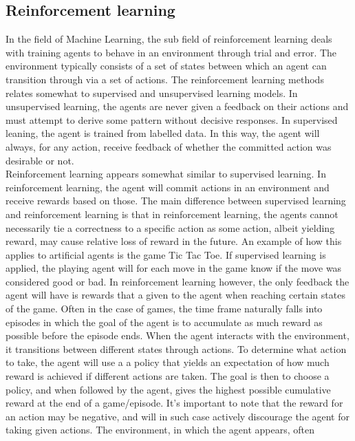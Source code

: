 \subsection{Reinforcement learning \label{RL}}

In the field of Machine Learning, the sub field of reinforcement learning
deals with training agents to behave in an environment through
trial and error. The environment typically consists of a set of states
between which an agent can transition through via a set of actions.
The reinforcement learning methods relates somewhat 
to supervised and unsupervised learning models. In unsupervised 
learning, the agents are never given a feedback on their actions
and must attempt to derive some pattern without decisive responses.
In supervised leaning, the agent is trained from labelled data.
In this way, the agent will always, for any action, receive 
feedback of whether the committed action was desirable or not.\\
Reinforcement learning appears somewhat similar to supervised learning.
In reinforcement learning, the agent will commit actions in an environment
and receive rewards based on those. The main difference between supervised
learning and reinforcement learning is that in reinforcement learning,
the agents cannot necessarily tie a correctness 
to a specific action as some action, albeit yielding reward,
may cause relative loss of reward in the future. An example of how this applies 
to artificial agents is the game Tic Tac Toe. If supervised learning
is applied, the playing agent will for each move in the game know
if the move was considered good or bad. In reinforcement learning however,
the only feedback the agent will have is rewards that a given 
to the agent when reaching certain states of the game. 
Often in the case of games, the 
time frame naturally falls into episodes in which the 
goal of the agent is to accumulate as much reward as possible 
before the episode ends. When the agent interacts 
with the environment, it transitions between different states through 
actions. To determine what action to take, the agent will use
a a policy that yields an expectation of how much reward is achieved
if different actions are taken. 
The goal is then to choose a policy, and when followed by the agent,
gives the highest possible cumulative reward at the end of a game/episode. 
It's important to note that the reward 
for an action may be negative, and will in such case actively discourage 
the agent for taking given actions.
The environment, in which the agent appears, often 

